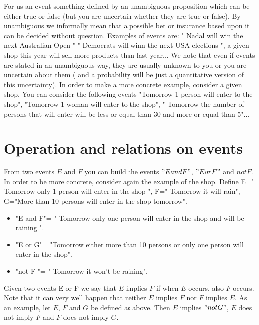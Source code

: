 \documentclass[reqno]{amsart}
\newcommand{\<}{{\langle \!\! \langle}}
\renewcommand{\>}{{\rangle \!\! \rangle}}
\newcommand{\commento}[1]{
	\par\noindent
	\colorbox{light}{\begin{minipage}{120 mm}#1\end{minipage}}
	\par\noindent
}
\begin{document}
For us an event something defined by an unambiguous proposition which can be either true or false (but you are uncertain whether they are true or false). By unambiguous we informally mean that a possible bet or insurance  based upon it can be decided without question. 
Examples of events are: " Nadal will win the next Australian Open " " Democrats will winn the next USA elections ", a given shop this year will sell more products than  last year... We note that even if events are stated in an unambiguous way, they are usually unknown to you or you are uncertain about them ( and a probability will be just a quantitative version of this uncertainty). 
In order to make a more concrete example, consider a given shop. You can consider the following events "Tomorrow 1 person will enter to the shop", "Tomorrow 1 woman will enter to the shop", " Tomorrow the number of persons that will enter will be less or equal than 30 and more or equal than 5"... 

\commento{}

\section{Operation and relations on events}

From two events $E$ and $F$ you can build the events $"E and F"$, $ "E or F"$ and $ not F$. In order to be more concrete, consider again the example of the shop. Define E=" Tomorrow only 1 person will enter in the shop ", F=" Tomorrow it will rain", G="More than 10 persons will enter in the shop tomorrow". 

\begin{itemize}

	\item "E and F"= " Tomorrow only one person will enter in the shop and will be raining ".\\
	\item "E or G"= "Tomorrow either more than 10 persons or only one person will enter in the shop".\\ 
	\item "not F "= " Tomorrow it won't be raining".\\

\end{itemize}

Given two events E or F we say that $E$ implies $F$ if when $E$ occurs, also $F$ occurs. Note that it can very well happen that neither $E$ implies $F$ nor $F$ implies $E$. As an example, let $E$, $F$ and $G$ be defined as above. Then $E$ implies $"not G"$, $E$ does not imply $F$ and $F$ does not imply $G$. 
\end{document}
